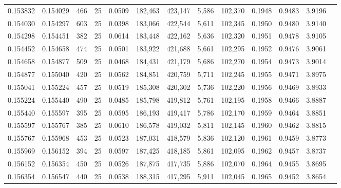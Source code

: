 \begin{tabular}{rrrrrrrrrrrrr}
0.153832 & 0.154029 &   466 &  25 &                                     0.0509 & 182,463 & 423,147 &   5,586 & 102,370 & 0.1948 & 0.9483 & 3.9196 \\
0.154030 & 0.154297 &   603 &  25 &                                     0.0398 & 183,066 & 422,544 &   5,611 & 102,345 & 0.1950 & 0.9480 & 3.9140 \\
0.154298 & 0.154451 &   382 &  25 &                                     0.0614 & 183,448 & 422,162 &   5,636 & 102,320 & 0.1951 & 0.9478 & 3.9105 \\
0.154452 & 0.154658 &   474 &  25 &                                     0.0501 & 183,922 & 421,688 &   5,661 & 102,295 & 0.1952 & 0.9476 & 3.9061 \\
0.154658 & 0.154877 &   509 &  25 &                                     0.0468 & 184,431 & 421,179 &   5,686 & 102,270 & 0.1954 & 0.9473 & 3.9014 \\
0.154877 & 0.155040 &   420 &  25 &                                     0.0562 & 184,851 & 420,759 &   5,711 & 102,245 & 0.1955 & 0.9471 & 3.8975 \\
0.155041 & 0.155224 &   457 &  25 &                                     0.0519 & 185,308 & 420,302 &   5,736 & 102,220 & 0.1956 & 0.9469 & 3.8933 \\
0.155224 & 0.155440 &   490 &  25 &                                     0.0485 & 185,798 & 419,812 &   5,761 & 102,195 & 0.1958 & 0.9466 & 3.8887 \\
0.155440 & 0.155597 &   395 &  25 &                                     0.0595 & 186,193 & 419,417 &   5,786 & 102,170 & 0.1959 & 0.9464 & 3.8851 \\
0.155597 & 0.155767 &   385 &  25 &                                     0.0610 & 186,578 & 419,032 &   5,811 & 102,145 & 0.1960 & 0.9462 & 3.8815 \\
0.155767 & 0.155968 &   453 &  25 &                                     0.0523 & 187,031 & 418,579 &   5,836 & 102,120 & 0.1961 & 0.9459 & 3.8773 \\
0.155969 & 0.156152 &   394 &  25 &                                     0.0597 & 187,425 & 418,185 &   5,861 & 102,095 & 0.1962 & 0.9457 & 3.8737 \\
0.156152 & 0.156354 &   450 &  25 &                                     0.0526 & 187,875 & 417,735 &   5,886 & 102,070 & 0.1964 & 0.9455 & 3.8695 \\
0.156354 & 0.156547 &   440 &  25 &                                     0.0538 & 188,315 & 417,295 &   5,911 & 102,045 & 0.1965 & 0.9452 & 3.8654 \\

\end{tabular}
